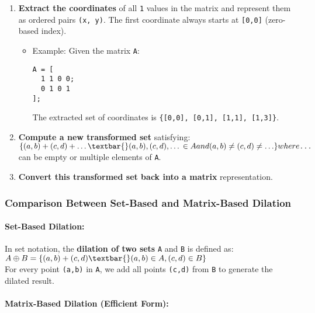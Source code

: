\documentclass[11pt]{amsart}
\theoremstyle{remark}
\theoremstyle{definition}
\theoremstyle{remark}
\numberwithin{equation}{section}
\begin{document}
\begin{enumerate}
\def\labelenumi{\arabic{enumi}.}
\item
  \textbf{Extract the coordinates} of all \texttt{1} values in the
  matrix and represent them as ordered pairs \texttt{(x,\ y)}. The first
  coordinate always starts at \texttt{{[}0,0{]}} (zero-based index).

  \begin{itemize}
  \item
    Example: Given the matrix \texttt{A}:

\begin{verbatim}
A = [
  1 1 0 0;
  0 1 0 1
];
\end{verbatim}

    The extracted set of coordinates is
    \texttt{\{{[}0,0{]},\ {[}0,1{]},\ {[}1,1{]},\ {[}1,3{]}\}}.
  \end{itemize}
\item
  \textbf{Compute a new transformed set} satisfying:\\
  $\{(a,b) + (c,d) + \ldots{} \textbar{} (a,b), (c,d), \ldots{} \in A and
  (a,b) \neq (c,d) \neq \ldots\} where \texttt{...}$ can be empty or multiple
  elements of \texttt{A}.
\item
  \textbf{Convert this transformed set back into a matrix}
  representation.
\end{enumerate}

\subsubsection{Comparison Between Set-Based and Matrix-Based
Dilation}\label{comparison-between-set-based-and-matrix-based-dilation}

\paragraph{Set-Based Dilation:}\label{set-based-dilation}

In set notation, the \textbf{dilation of two sets} \texttt{A} and
\texttt{B} is defined as:\\
$A \oplus B = \{ (a,b) + (c,d) \textbar{} (a,b) \in A, (c,d) \in B \}$\\
For every point \texttt{(a,b)} in \texttt{A}, we add all points
\texttt{(c,d)} from \texttt{B} to generate the dilated result.

\paragraph{Matrix-Based Dilation (Efficient
Form):}\label{matrix-based-dilation-efficient-form}
\end{document}
